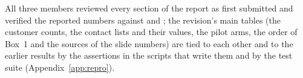 All three members reviewed every section of the report as first submitted and
verified the reported numbers against  and
; the revision's main tables (the customer counts, the
contact lists and their values, the pilot arms, the order of Box~1 and the
sources of the slide numbers) are tied to each other and to the earlier results
by the assertions in the scripts that write them and by the test suite
(Appendix~\ref{app:repro}).
